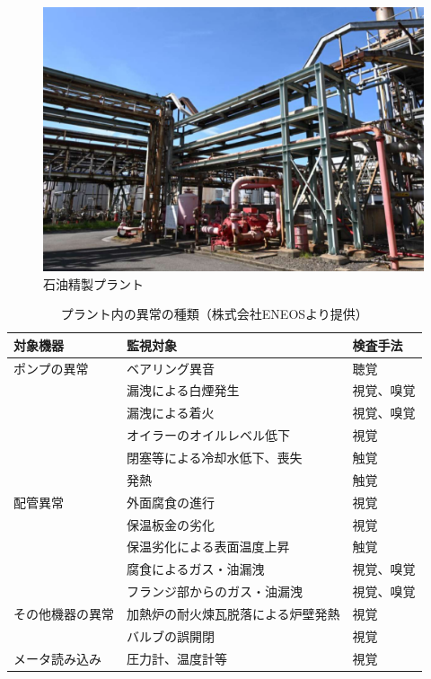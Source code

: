 \documentclass[../main]{subfiles}
\begin{document}
\begin{figure}[t]
  \centering
  \includegraphics[keepaspectratio, width=0.8\linewidth]{chap1/view_plant.png}
  \caption{石油精製プラント}
  \label{fig:view_plant}
\end{figure}


\begin{table}[t]
  \caption{プラント内の異常の種類（株式会社ENEOSより提供）}
  \label{tab:plant_anomalies}
  \centering
  \begin{tabular}{lll}
    \toprule
    対象機器 & 監視対象 & 検査手法 \\
    \midrule
    ポンプの異常 & ベアリング異音 & 聴覚 \\
                 & 漏洩による白煙発生 & 視覚、嗅覚 \\
                 & 漏洩による着火 & 視覚、嗅覚 \\
                 & オイラーのオイルレベル低下 & 視覚 \\
                 & 閉塞等による冷却水低下、喪失 & 触覚 \\
                 & 発熱 & 触覚 \\
    \midrule
    配管異常 & 外面腐食の進行 & 視覚 \\
               & 保温板金の劣化 & 視覚 \\
               & 保温劣化による表面温度上昇 & 触覚 \\
               & 腐食によるガス・油漏洩 & 視覚、嗅覚 \\
               & フランジ部からのガス・油漏洩 & 視覚、嗅覚 \\
    \midrule
    その他機器の異常 & 加熱炉の耐火煉瓦脱落による炉壁発熱 & 視覚 \\
                   & バルブの誤開閉 & 視覚 \\
    \midrule
    メータ読み込み & 圧力計、温度計等 & 視覚 \\
    \bottomrule
  \end{tabular}
\end{table}
\end{document}
